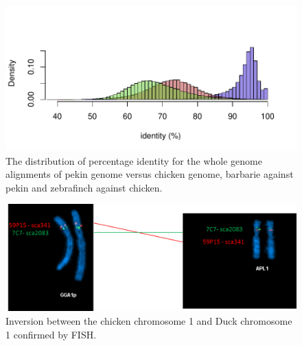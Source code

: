 \documentclass[10pt,letterpaper]{article}
\begin{document}
\begin{figure}[h!]
 \includegraphics[scale=0.9]{S4_percentidentity}
   \caption{
   The distribution of percentage identity for the whole genome alignments of pekin genome versus chicken genome, barbarie against pekin and zebrafinch against chicken.}
\label{suppfig4}
\end{figure}

\begin{figure}[h!]
 \includegraphics[scale=0.7]{S5_FISH}
   \caption{
   Inversion between the chicken chromosome 1 and Duck chromosome 1 confirmed by FISH.}
\label{suppfig5}
\end{figure}
\end{document}
